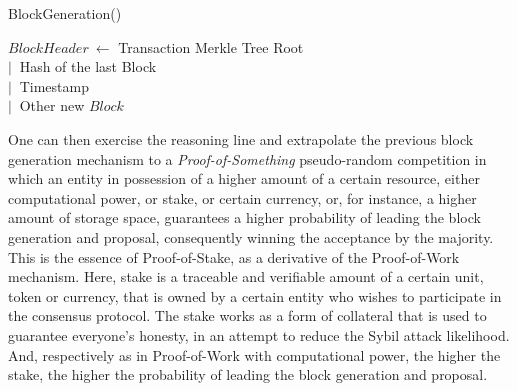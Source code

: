 \begin{procedure} [!h]
	\caption{BlockGeneration()} \label{proc:BlockGeneration}
	\BlankLine
  $BlockHeader \ \gets$ Transaction Merkle Tree Root
  \\ \qquad $| \ $ Hash of the last Block
  \\ \qquad $| \ $ Timestamp
  \\ \qquad $| \ $ Other\;
  \BlankLine
  \Return new $Block$\;
\end{procedure}

One can then exercise the reasoning line and extrapolate the previous block generation mechanism to a \emph{Proof-of-Something} pseudo-random competition in which an entity in possession of a higher amount of a certain resource, either computational power, or stake, or certain currency, or, for instance, a higher amount of storage space, guarantees a higher probability of leading the block generation and proposal, consequently winning the acceptance by the majority. This is the essence of Proof-of-Stake, as a derivative of the Proof-of-Work mechanism. Here, stake is a traceable and verifiable amount of a certain unit, token or currency, that is owned by a certain entity who wishes to participate in the consensus protocol. The stake works as a form of collateral that is used to guarantee everyone's honesty, in an attempt to reduce the Sybil attack likelihood. And, respectively as in Proof-of-Work with computational power, the higher the stake, the higher the probability of leading the block generation and proposal.


